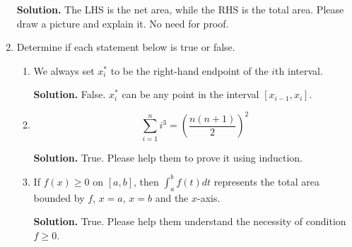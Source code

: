 \documentclass[12pt]{article}
\begin{document}
\begin{enumerate}
\textbf{Solution. }The LHS is the net area, while the RHS is the total area. Please draw a picture and explain it. No need for proof.

\item Determine if each statement below is true or false.

	\begin{enumerate}
	\item We always set $x_i^*$ to be the right-hand endpoint of the $i$th interval.

\textbf{Solution.} False. $x_i^*$ can be any point in the interval $[x_{i-1},x_i]$.

	\item $$\sum_{i=1}^n i^3=\left(\frac{n(n+1)}{2}\right)^2$$

\textbf{Solution. }True. Please help them to prove it using induction.

	\item If $f(x)\geq 0$ on $[a,b]$, then $\int_{a}^b f(t)dt$ represents the total area bounded by $f$, $x=a$, $x=b$ and the $x$-axis.

\textbf{Solution. }True. Please help them understand the necessity of condition $f\geq 0$. 
	\end{enumerate}
\end{enumerate}
\end{document}
